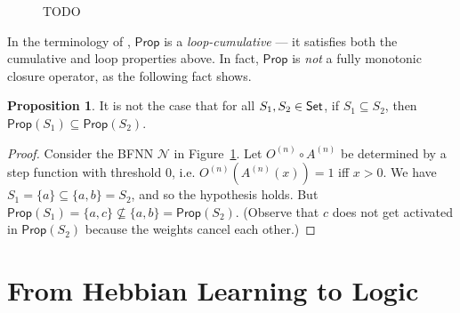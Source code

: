 \documentclass[letterpaper]{article}
\theoremstyle{definition}
\newtheorem{proposition}{Proposition}
\newcommand{\Set}{\mbox{\sf Set}}
\newcommand{\set}[1]{\{ #1 \}}
\newcommand{\Prop}{\textsf{Prop}}
\newcommand{\Net}{\mathcal{N}}
\begin{document}
\begin{figure}
{
}
\caption{\textcolor{myred}{TODO}}
\label{fig:monotonicity-counterexamples}
\end{figure}

In the terminology of \citep{kraus1990nonmonotonic}, $\Prop$ is a \emph{loop-cumulative} --- it satisfies both the cumulative and loop properties above.  In fact, $\Prop$ is \emph{not} a fully monotonic closure operator, as the following fact shows.

\begin{proposition}
It is not the case that for all $S_1, S_2 \in \Set$, if $S_1 \subseteq S_2$, then $\Prop(S_1) \subseteq \Prop(S_2)$.
\end{proposition}
\begin{proof}
Consider the BFNN $\Net$ in Figure~\ref{fig:monotonicity-counterexamples}. Let $O^{(n)} \circ A^{(n)}$ be determined by a step function with threshold $0$, i.e. $O^{(n)}(A^{(n)}(x)) = 1$ iff $x > 0$.  We have $S_1 = \set{a} \subseteq \set{a, b} = S_2$, and so the hypothesis holds. But $\Prop(S_1) = \set{a, c} \not \subseteq \set{a, b} = \Prop(S_2)$. (Observe that $c$ does not get activated in $\Prop(S_2)$ because the weights cancel each other.)
\end{proof}


\section{From Hebbian Learning to Logic}
\end{document}
